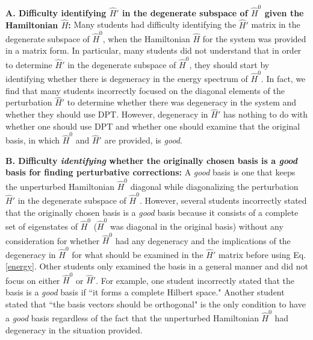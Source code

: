 \documentclass[aps,pra,showpacs,showkeys,twocolumn,groupedaddress]{revtex4-1}
\begin{document}
{\bf A. Difficulty identifying $\hat{H}'$ in the degenerate subspace of $\hat{H}^0$ given the Hamiltonian $\hat{H}$:}  
Many students had difficulty identifying the $\hat{H}'$ matrix in the degenerate subspace of $\hat{H}^0$, when the Hamiltonian $\hat{H}$ for the system was provided in a matrix form.  In particular, many students did not understand that in order to determine $\hat{H}'$ in the degenerate subspace of $\hat{H}^0$, they should start by identifying whether there is degeneracy in the energy spectrum of $\hat{H}^0$.  In fact, we find that many students incorrectly focused on the diagonal elements of the perturbation $\hat{H}'$ to determine whether there was degeneracy in the system and whether they should use DPT.   
However, degeneracy in $\hat{H}'$ has nothing to do with whether one should use DPT and whether one should examine that the original basis, in which $\hat{H}^0$ and $\hat{H}'$ are provided, is {\it good}. 

{\bf B. Difficulty {\it identifying} whether the originally chosen basis is a {\it good} basis for finding perturbative corrections:}  A {\it good} basis is one that keeps the unperturbed Hamiltonian $\hat{H}^0$ diagonal while diagonalizing the perturbation $\hat{H}'$ in the degenerate subspace of $\hat{H}^0$.  However, several students incorrectly stated that the originally chosen basis is a {\it good} basis because it consists of a complete set of eigenstates of $\hat{H}^0$ ($\hat{H}^0$ was diagonal in the original basis) without any consideration for whether $\hat{H}^0$ had any degeneracy and the implications of the degeneracy in $\hat{H}^0$ for what should be examined in the $\hat{H}'$ matrix before using Eq. \ref{energy}.  Other students only examined the basis in a general manner and did not focus on either $\hat{H}^0$ or $\hat{H}'$.  For example, one student incorrectly stated that the basis is a {\it good} basis if ``it forms a complete Hilbert space."  Another student stated that ``the basis vectors should be orthogonal" is the only condition to have a {\it good} basis regardless of the fact that the unperturbed Hamiltonian $\hat{H}^0$ had degeneracy in the situation provided.  
\end{document}
